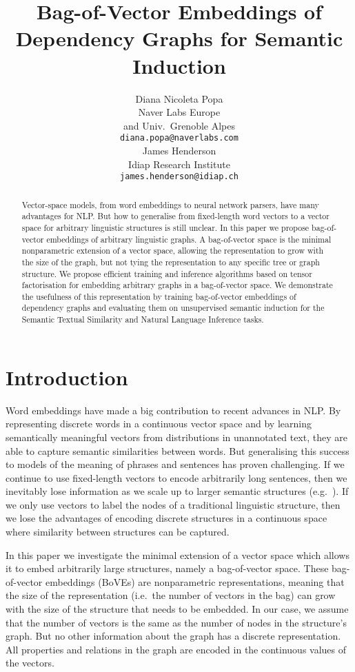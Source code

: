 \documentclass[11pt,a4paper]{article}
\title{ Bag-of-Vector Embeddings of Dependency Graphs for Semantic Induction
}
\author{ Diana Nicoleta Popa \\
  Naver Labs Europe \\
  and Univ.\ Grenoble Alpes \\
  {\tt diana.popa@naverlabs.com} \\\And
  James Henderson\Thanks{~This article reports work done while both authors were at Xerox Research Centre Europe.} \\
  Idiap Research Institute \\ 
  {\tt james.henderson@idiap.ch} 
}
\date{}
\newcommand{\boves}{Bo{\nolinebreak\hspace{-0.25ex}}VEs}
\begin{document}
\maketitle
\begin{abstract}

Vector-space models, from word embeddings to neural network parsers, have many
advantages for NLP.  But how to generalise from fixed-length word vectors to a
vector space for arbitrary linguistic structures is still unclear.  In this
paper we propose bag-of-vector embeddings of arbitrary linguistic graphs.  A
bag-of-vector space is the minimal nonparametric extension of 
a vector space, allowing the representation to grow with the size of the
graph, but not tying the representation to any specific tree or graph
structure.  We propose efficient training and inference algorithms based on
tensor factorisation for embedding arbitrary graphs in a bag-of-vector space.
We demonstrate the usefulness of this representation by training bag-of-vector
embeddings of dependency graphs and evaluating them on unsupervised semantic
induction for the Semantic Textual Similarity and Natural Language Inference
tasks.

\end{abstract}


\section{Introduction}

Word embeddings have made a big contribution to recent advances in NLP.  By
representing discrete words in a continuous vector space and by learning
semantically meaningful vectors from distributions in unannotated text, they
are able to capture semantic similarities between words.  But generalising
this success to models of the meaning of phrases and sentences has proven
challenging.  If we continue to use fixed-length vectors to encode arbitrarily
long sentences, then we inevitably lose information as we scale up to
larger semantic structures (e.g.\ \cite{adi2016fine,Blacoe2012,Mitchell-Lapata2010,Socher2011_nips,Kiros2015,le2014distributed,Li-Jurafsky2015,Cho2014,Sutskever2014}).
If we only use vectors to label the nodes of a
traditional linguistic structure, then we lose the advantages of encoding
discrete structures in a continuous space where similarity between structures
can be captured.

In this paper we investigate the minimal extension of a vector space which
allows it to embed arbitrarily large structures, namely a bag-of-vector
space.  These bag-of-vector embeddings (\boves) are nonparametric
representations, meaning that the size of the representation (i.e.\ the number
of vectors in the bag) can grow with the size of the structure that needs to
be embedded.  In our case, we assume that the number of vectors is the same as
the number of nodes in the structure's graph.  But no other information about
the graph has a discrete representation.  All properties and relations in the
graph are encoded in the continuous values of the vectors.
\end{document}
